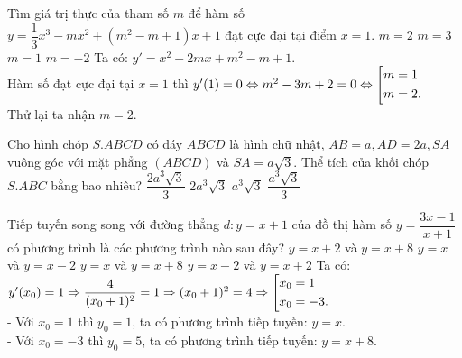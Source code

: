 \begin{ex}%
Tìm giá trị thực của tham số $m$ để hàm số $y = \dfrac{1}{3}x^3-mx^2+(m^2-m+1)x+1$ đạt cực đại tại điểm $x = 1$.
 \choice
  { \True $m = 2$}
  { $m = 3$}
  { $m = 1$}
  { $m = -2$}
 \loigiai
  {
  Ta có: $y' = x^2-2mx+m^2-m+1$.\\
  Hàm số đạt cực đại tại $x = 1$ thì $y'(1) = 0 \Leftrightarrow m^2-3m+2=0 \Leftrightarrow \left[\begin{aligned}& m=1 \\& m=2.\end{aligned}\right.$\\
  Thử lại ta nhận $m=2$.
  }
\end{ex}


\begin{ex}%
Cho hình chóp $S.ABCD$ có đáy $ABCD$ là hình chữ nhật, $AB = a, AD = 2a, SA$ vuông góc với mặt phẳng $(ABCD)$ và $SA = a\sqrt{3}$. Thể tích của khối chóp $S.ABC$ bằng bao nhiêu?
 \choice
  { $\dfrac{2a^3\sqrt{3}}{3}$}
  { $2a^3\sqrt{3}$}
  { $a^3\sqrt{3}$}
  { \True $\dfrac{a^3\sqrt{3}}{3}$}
 \loigiai
  {
  {
  }
  }
\end{ex}


\begin{ex}%
Tiếp tuyến song song với đường thẳng $d: y = x+1$ của đồ thị hàm số $y = \dfrac{3x-1}{x+1}$ có phương trình là các phương trình nào sau đây?
 \choice
  { $y = x+2$ và $ y = x+8$}
  { $y = x$ và $ y = x-2$}
  { \True $y = x$ và $ y = x+8$}
  { $y = x-2$ và $ y = x+2$}
 \loigiai
  {
  Ta có: $y'(x_0) = 1 \Rightarrow \dfrac{4}{(x_0+1)^2}=1 \Rightarrow (x_0 + 1)^2 =4 \Rightarrow \left[\begin{aligned}& x_0 = 1 \\& x_0 = -3.\end{aligned}\right.$\\
  - Với $x_0 =1$ thì $y_0 =1$, ta có phương trình tiếp tuyến: $y = x$.\\
  - Với $x_0 =-3$ thì $y_0 =5$, ta có phương trình tiếp tuyến: $y = x+8$.
  }
\end{ex}


